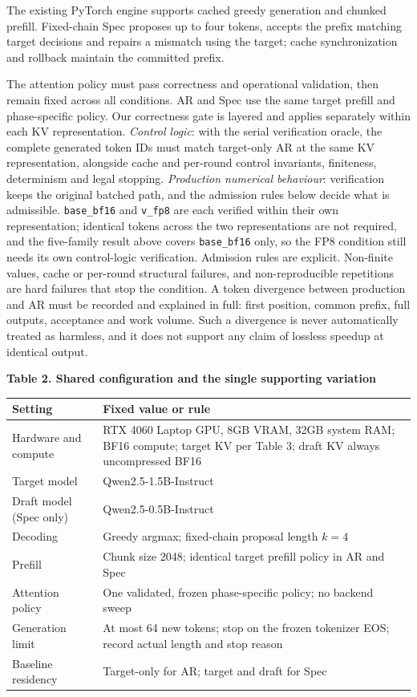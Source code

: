 \documentclass[11pt,a4paper]{article}
\makeatletter
\renewcommand\section{\@startsection{section}{1}{0pt}{-0.9em}{0.2em}{\normalfont\large\bfseries\color{PolyUBlue}}}
\makeatother
\begin{document}
\section{Proposed Method}
The existing PyTorch engine supports cached greedy generation and chunked prefill. Fixed-chain Spec proposes up to four tokens, accepts the prefix matching target decisions and repairs a mismatch using the target; cache synchronization and rollback maintain the committed prefix.

The attention policy must pass correctness and operational validation, then remain fixed across all conditions. AR and Spec use the same target prefill and phase-specific policy. Our correctness gate is layered and applies separately within each KV representation. \emph{Control logic}: with the serial verification oracle, the complete generated token IDs must match target-only AR at the same KV representation, alongside cache and per-round control invariants, finiteness, determinism and legal stopping. \emph{Production numerical behaviour}: verification keeps the original batched path, and the admission rules below decide what is admissible. \texttt{base\_bf16} and \texttt{v\_fp8} are each verified within their own representation; identical tokens across the two representations are not required, and the five-family result above covers \texttt{base\_bf16} only, so the FP8 condition still needs its own control-logic verification. Admission rules are explicit. Non-finite values, cache or per-round structural failures, and non-reproducible repetitions are hard failures that stop the condition. A token divergence between production and AR must be recorded and explained in full: first position, common prefix, full outputs, acceptance and work volume. Such a divergence is never automatically treated as harmless, and it does not support any claim of lossless speedup at identical output.

\textbf{Table 2. Shared configuration and the single supporting variation}\par
\begin{tabularx}{\linewidth}{@{}>{\raggedright\arraybackslash}p{3.1cm} X@{}}
\toprule
\textbf{Setting} & \textbf{Fixed value or rule} \\
\midrule
Hardware and compute & RTX 4060 Laptop GPU, 8GB VRAM, 32GB system RAM; BF16 compute; target KV per Table 3; draft KV always uncompressed BF16 \\
Target model & Qwen2.5-1.5B-Instruct \\
Draft model (Spec only) & Qwen2.5-0.5B-Instruct \\
Decoding & Greedy argmax; fixed-chain proposal length $k=4$ \\
Prefill & Chunk size 2048; identical target prefill policy in AR and Spec \\
Attention policy & One validated, frozen phase-specific policy; no backend sweep \\
Generation limit & At most 64 new tokens; stop on the frozen tokenizer EOS; record actual length and stop reason \\
Baseline residency & Target-only for AR; target and draft for Spec \\
\bottomrule
\end{tabularx}
\end{document}
